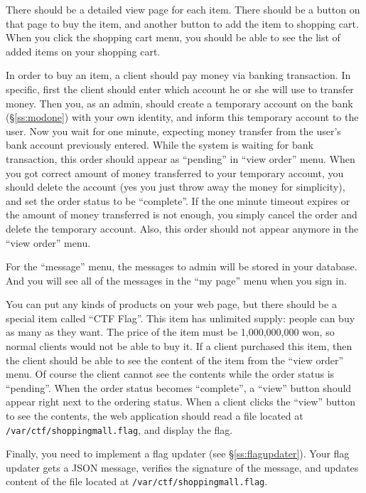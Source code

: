 \documentclass[a4paper, 11pt]{article}
\theoremstyle{definition}
\begin{document}
{There should be a detailed view page for each item. There should be a
button on that page to buy the item, and another button to add the
item to shopping cart. When you click the shopping cart menu, you
should be able to see the list of added items on your shopping cart.

In order to buy an item, a client should pay money via banking
transaction. In specific, first the client should enter which account
he or she will use to transfer money. Then you, as an admin, should
create a temporary account on the bank (\S\ref{ss:modone}) with your
own identity, and inform this temporary account to the user. Now you
wait for one minute, expecting money transfer from the user's bank
account previously entered.  While the system is waiting for bank
transaction, this order should appear as ``pending'' in ``view order''
menu. When you got correct amount of money transferred to your
temporary account, you should delete the account (yes you just throw
away the money for simplicity), and set the order status to be
``complete''. If the one minute timeout expires or the amount of money
transferred is not enough, you simply cancel the order and delete the
temporary account. Also, this order should not appear anymore in the
``view order'' menu.

For the ``message'' menu, the messages to admin will be stored in
your database. And you will see all of the messages in the ``my
page'' menu when you sign in.

You can put any kinds of products on your web page, but there should
be a special item called ``CTF Flag''. This item has unlimited supply:
people can buy as many as they want. The price of the item must be
1,000,000,000 won, so normal clients would not be able to buy it. If a
client purchased this item, then the client should be able to see the
content of the item from the ``view order'' menu. Of course the client
cannot see the contents while the order status is ``pending''. When
the order status becomes ``complete'', a ``view'' button should appear
right next to the ordering status. When a client clicks the ``view''
button to see the contents, the web application should read a file
located at \texttt{/var/ctf/shoppingmall.flag}, and display the flag.

Finally, you need to implement a flag updater (see
\S\ref{ss:flagupdater}). Your flag updater gets a JSON message,
verifies the signature of the message, and updates content of the file
located at \texttt{/var/ctf/shoppingmall.flag}.

}
\end{document}

